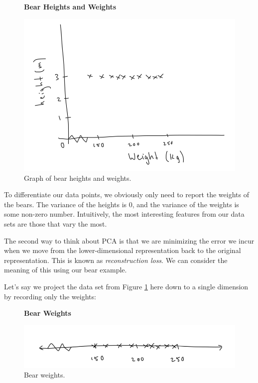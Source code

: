 \begin{figure}
    \centering
    \textbf{Bear Heights and Weights}\par\medskip
    \includegraphics[width=0.5\paperwidth]{../DimensionalityReduction/fig/bear-graph.png}
    \caption{Graph of bear heights and weights.}
    \label{fig:bear-graph}
\end{figure}

To differentiate our data points, we obviously only need to report the weights of the bears. The variance of the heights is 0, and the variance of the weights is some non-zero number. Intuitively, the most interesting features from our data sets are those that vary the most.


The second way to think about PCA is that we are minimizing the error we incur when we move from the lower-dimensional representation back to the original representation. This is known as \textit{reconstruction loss}. We can consider the meaning of this using our bear example.

Let's say we project the data set from Figure \ref{fig:bear-graph} here down to a single dimension by recording only the weights:

\begin{figure}
    \centering
    \textbf{Bear Weights}\par\medskip
    \includegraphics[width=0.5\paperwidth]{../DimensionalityReduction/fig/bear-weights-line.png}
    \caption{Bear weights.}
    \label{fig:bear-weights-line}
\end{figure}

